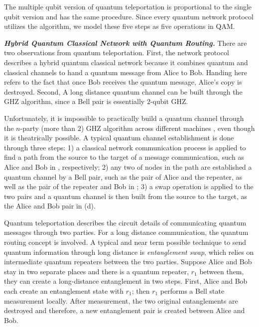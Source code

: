 The multiple qubit version of quantum teleportation \cite{Rigolin_2005} is proportional to the single qubit version
and has the same procedure.
Since every quantum network protocol utilizes the algorithm, we model these five steps as five operations in QAM.

\noindent\textbf{\textit{Hybrid Quantum Classical Network with Quantum Routing.}}
There are two observations from quantum teleportation. First, the network protocol describes a hybrid quantum classical network because it combines quantum and classical channels to hand a quantum message from Alice to Bob. Handing here refers to the fact that once Bob receives the quantum message, Alice's copy is destroyed. Second, A long distance quantum channel can be built through the GHZ algorithm, since a Bell pair is essentially $2$-qubit GHZ.

Unfortunately, it is impossible to practically build a quantum channel through the $n$-party (more than $2$) GHZ algorithm across different machines \cite{Illiano_2022}, even though it is theatrically possible.
A typical quantum channel establishment is done through three steps: 1) a classical network communication process is applied to find a path from the source to the target of a message communication, such as Alice and Bob in , respectively; 2) any two of nodes in the path are established a quantum channel by a Bell pair, such as the pair of Alice and the repeater, as well as the pair of the repeater and Bob in ; 3) a swap operation is applied to the two pairs and a quantum channel is then built from the source to the target, as the Alice and Bob pair in (d).

Quantum teleportation describes the circuit details of communicating quantum messages through two parties.
For a long distance communication, the quantum routing concept is involved.
A typical and near term possible technique to send quantum information through long distance is \textit{entanglement swap},
which relies on intermediate quantum repeaters between the two parties. Suppose Alice and Bob stay in two separate places and there is a quantum repeater, $r_1$ between them, they can create a long-distance entanglement in two steps. First, Alice and Bob each create an entanglement state with $r_1$; then $r_1$ performs a Bell state measurement locally. After measurement, the two original entanglements are destroyed and therefore, a new entanglement pair is created between Alice and Bob. 

